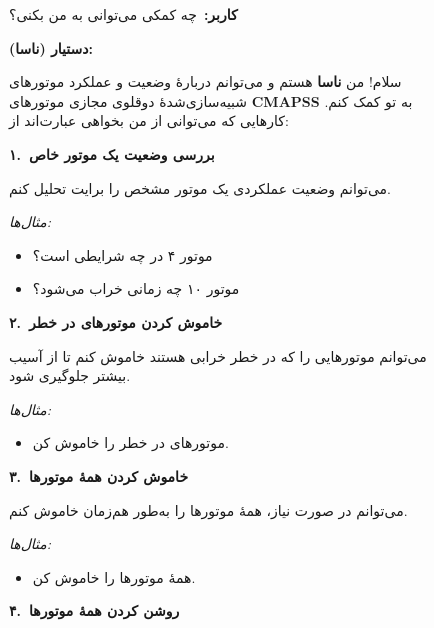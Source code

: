 \documentclass[a4paper,fleqn]{report}
\newcommand{\qaSection}[2]{%
  \vspace{6pt}%
  {\color{sectionColor}\textbf{#1.\ #2}}%
  \vspace{2pt}%
}
\newcommand{\exLabel}{\textit{\textcolor{exampleColor}{مثال‌ها:}}}
\begin{document}
\begin{figure}[h]
	\centering
	\begin{minipage}{0.92\textwidth}
		
		\begin{userBox}
			\textbf{کاربر:}\ چه کمکی می‌توانی به من بکنی؟
		\end{userBox}
		
		\begin{botBox}
			\textbf{دستیار (ناسا):}
			
			سلام! من \textbf{ناسا} هستم و می‌توانم دربارهٔ وضعیت و عملکرد موتورهای
			شبیه‌سازی‌شدهٔ دوقلوی مجازی موتورهای \textbf{CMAPSS} به تو کمک کنم.
			کارهایی که می‌توانی از من بخواهی عبارت‌اند از:
			
			\medskip
			
			\qaSection{۱}{بررسی وضعیت یک موتور خاص}
			
			می‌توانم وضعیت عملکردی یک موتور مشخص را برایت تحلیل کنم.
			
			\exLabel
			\begin{itemize}[rightmargin=1.5em, topsep=2pt, itemsep=1pt]
				\item موتور ۴ در چه شرایطی است؟
				\item موتور ۱۰ چه زمانی خراب می‌شود؟
			\end{itemize}
			
			\medskip
			\qaSection{۲}{خاموش کردن موتورهای در خطر}
			
			می‌توانم موتورهایی را که در خطر خرابی هستند خاموش کنم تا از آسیب بیشتر جلوگیری شود.
			
			\exLabel
			\begin{itemize}[rightmargin=1.5em, topsep=2pt, itemsep=1pt]
				\item موتورهای در خطر را خاموش کن.
			\end{itemize}
			
			\medskip
			\qaSection{۳}{خاموش کردن همهٔ موتورها}
			
			می‌توانم در صورت نیاز، همهٔ موتورها را به‌طور هم‌زمان خاموش کنم.
			
			\exLabel
			\begin{itemize}[rightmargin=1.5em, topsep=2pt, itemsep=1pt]
				\item همهٔ موتورها را خاموش کن.
			\end{itemize}
			
			\medskip
			\qaSection{۴}{روشن کردن همهٔ موتورها}
			

\end{botBox}
\end{minipage}
\end{figure}
\end{document}
